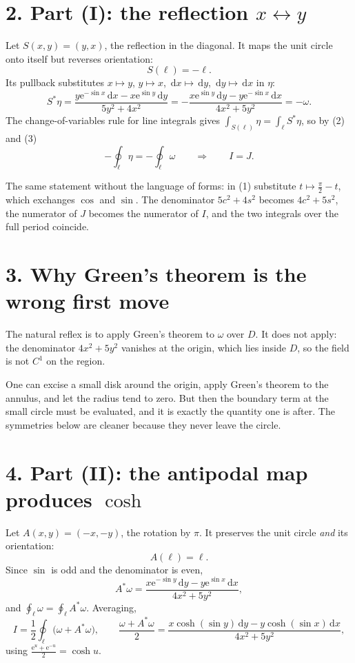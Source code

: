 \documentclass[12pt]{article}
\newcommand{\dd}{\,\mathrm{d}}
\newcommand{\e}{\mathrm{e}}
\newcommand{\lc}{\ell}
\begin{document}
\section*{2. Part (I): the reflection \(x\leftrightarrow y\)}

Let \(S(x,y)=(y,x)\), the reflection in the diagonal. It maps the unit
circle onto itself but reverses orientation:
\[
S(\lc)=-\lc .
\tag{2}
\]
Its pullback substitutes \(x\mapsto y\), \(y\mapsto x\),
\(\dd x\mapsto\dd y\), \(\dd y\mapsto\dd x\) in \(\eta\):
\[
S^{*}\eta
=\frac{y\e^{-\sin x}\dd x-x\e^{\sin y}\dd y}{5y^2+4x^2}
=-\frac{x\e^{\sin y}\dd y-y\e^{-\sin x}\dd x}{4x^2+5y^2}
=-\omega .
\tag{3}
\]
The change-of-variables rule for line integrals gives
\(\int_{S(\lc)}\eta=\int_{\lc}S^{*}\eta\), so by (2) and (3)
\[
-\oint_{\lc}\eta=-\oint_{\lc}\omega
\qquad\Longrightarrow\qquad
\boxed{I=J.}
\]

The same statement without the language of forms: in (1) substitute
\(t\mapsto\frac\pi2-t\), which exchanges \(\cos\) and \(\sin\). The
denominator \(5c^2+4s^2\) becomes \(4c^2+5s^2\), the numerator of \(J\)
becomes the numerator of \(I\), and the two integrals over the full
period coincide.

\section*{3. Why Green's theorem is the wrong first move}

The natural reflex is to apply Green's theorem to \(\omega\) over \(D\).
It does not apply: the denominator \(4x^2+5y^2\) vanishes at the origin,
which lies inside \(D\), so the field is not \(C^1\) on the region.

One can excise a small disk around the origin, apply Green's theorem to
the annulus, and let the radius tend to zero. But then the boundary
term at the small circle must be evaluated, and it is exactly the
quantity one is after. The symmetries below are cleaner because they
never leave the circle.

\section*{4. Part (II): the antipodal map produces \(\cosh\)}

Let \(A(x,y)=(-x,-y)\), the rotation by \(\pi\). It preserves the unit
circle \emph{and} its orientation:
\[
A(\lc)=\lc .
\]
Since \(\sin\) is odd and the denominator is even,
\[
A^{*}\omega=\frac{x\e^{-\sin y}\dd y-y\e^{\sin x}\dd x}{4x^2+5y^2},
\tag{4}
\]
and \(\oint_\lc\omega=\oint_\lc A^{*}\omega\). Averaging,
\[
I=\frac12\oint_{\lc}\bigl(\omega+A^{*}\omega\bigr),
\qquad
\frac{\omega+A^{*}\omega}{2}
=\frac{x\cosh(\sin y)\dd y-y\cosh(\sin x)\dd x}{4x^2+5y^2},
\tag{5}
\]
using \(\frac{\e^{u}+\e^{-u}}{2}=\cosh u\).
\end{document}
